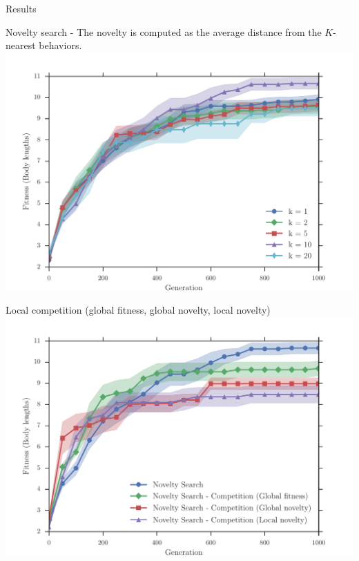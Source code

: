 \documentclass{beamer}
\begin{document}
\begin{frame}[allowframebreaks]{Results}
\begin{minipage}{\textwidth}
\begin{block}{Novelty search - The novelty is computed as the average distance from the $K$-nearest behaviors.}
\includegraphics[width=1.0\textwidth]{../Figures/Results/KnnExperimentSize5.pdf}
\end{block}
\end{minipage}

\begin{minipage}{\textwidth}
\begin{block}{Local competition (global fitness, global novelty, local novelty)}
\includegraphics[width=1.0\textwidth]{../Figures/Results/NoveltyCompetitionsSize5.pdf}
\end{block}
\end{minipage}


\end{frame}
\end{document}
